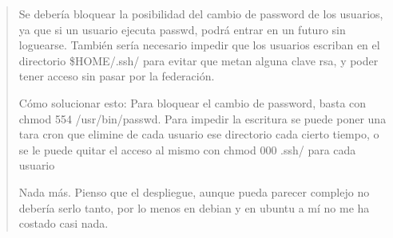 \begin{quote}
Se debería bloquear la posibilidad del cambio de password de los
usuarios, ya que si un usuario ejecuta passwd, podrá entrar en un futuro
sin loguearse.
También sería necesario impedir que los usuarios escriban en el
directorio \$HOME/.ssh/ para evitar que metan alguna clave rsa, y poder
tener acceso sin pasar por la federación.

Cómo solucionar esto:
Para bloquear el cambio de password, basta con chmod
554 /usr/bin/passwd.
Para impedir la escritura se puede poner una tara cron que elimine de
cada usuario ese directorio cada cierto tiempo, o se le puede quitar el
acceso al mismo con chmod 000 .ssh/ para cada usuario


Nada más. Pienso que el despliegue, aunque pueda parecer complejo no
debería serlo tanto, por lo menos en debian y en ubuntu a mí no me ha
costado casi nada.


    \end{quote}


\newpage


